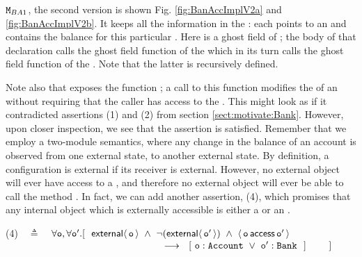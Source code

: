 ${\mbox{\tt{\ensuremath{{\mbox{\tt{M}}}}}}}_{BA1}$, the second version is shown Fig. \ref{fig:BanAccImplV2a} and \ref{fig:BanAccImplV2b}. It keeps all the information 
in the : each  points to an  
and contains the balance for this particular . Here  is a
ghost field of ; the body of that declaration calls the ghost field function  of the  which in its
turn calls the ghost field function  of the . Note that the latter is recursively defined.

Note also that  exposes the function ; a call to this function   modifies the  of an  without requiring that the caller has access to the . This might look as if it contradicted assertions (1) and  (2)
  from section \ref{sect:motivate:Bank}. However, upon closer inspection, we see that the assertion is satisfied. Remember that we employ a two-module semantics, where any change in the balance of an account is observed from one external state, to another external state. By definition, a configuration is external if its receiver is external.  However, no external object will ever have access to a , and therefore no external object will ever be able to call the method . In fact, we can add another assertion, (4), which promises that any internal object which is externally accessible is either a  or an .

(4)\ \  $\triangleq$\ \ $\forall {\mbox{\tt{o}}},\forall {\mbox{\tt{o}}}'.[\ \ {\mathsf{external}}\langle\,  {\mbox{\tt{o}}}\, \rangle\  \wedge\ \neg ({\mathsf{external}}\langle\,  {\mbox{\tt{o}}}'\, \rangle) \ \wedge\    \langle\, {\mbox{\tt{o}}}\, \mathsf{access}\, {\mbox{\tt{o}}}'\, \rangle$\\
  $\strut \hspace{5.6cm}    
    \longrightarrow \ \    %
  [\    \prg{o}:\prg{Account}\ \vee \ \prg{o}':\prg{Bank}\  \ ]\ \ \  \ \ \ \ ] \hfill $


